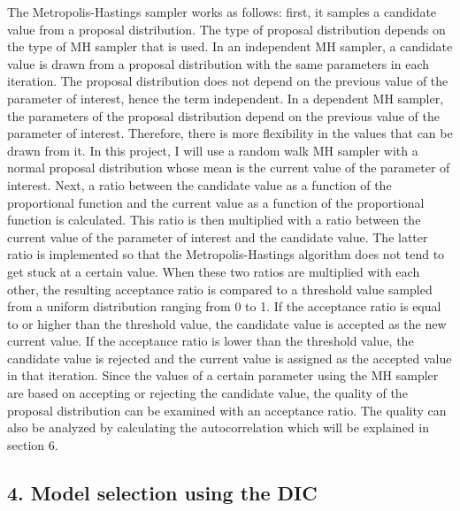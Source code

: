 \documentclass[
]{article}
\begin{document}
The Metropolis-Hastings sampler works as follows: first, it samples a
candidate value from a proposal distribution. The type of proposal
distribution depends on the type of MH sampler that is used. In an
independent MH sampler, a candidate value is drawn from a proposal
distribution with the same parameters in each iteration. The proposal
distribution does not depend on the previous value of the parameter of
interest, hence the term independent. In a dependent MH sampler, the
parameters of the proposal distribution depend on the previous value of
the parameter of interest. Therefore, there is more flexibility in the
values that can be drawn from it. In this project, I will use a random
walk MH sampler with a normal proposal distribution whose mean is the
current value of the parameter of interest. Next, a ratio between the
candidate value as a function of the proportional function and the
current value as a function of the proportional function is calculated.
This ratio is then multiplied with a ratio between the current value of
the parameter of interest and the candidate value. The latter ratio is
implemented so that the Metropolis-Hastings algorithm does not tend to
get stuck at a certain value. When these two ratios are multiplied with
each other, the resulting acceptance ratio is compared to a threshold
value sampled from a uniform distribution ranging from 0 to 1. If the
acceptance ratio is equal to or higher than the threshold value, the
candidate value is accepted as the new current value. If the acceptance
ratio is lower than the threshold value, the candidate value is rejected
and the current value is assigned as the accepted value in that
iteration. Since the values of a certain parameter using the MH sampler
are based on accepting or rejecting the candidate value, the quality of
the proposal distribution can be examined with an acceptance ratio. The
quality can also be analyzed by calculating the autocorrelation which
will be explained in section 6.

\hypertarget{model-selection-using-the-dic}{%
\subsection{4. Model selection using the
DIC}\label{model-selection-using-the-dic}}
\end{document}
